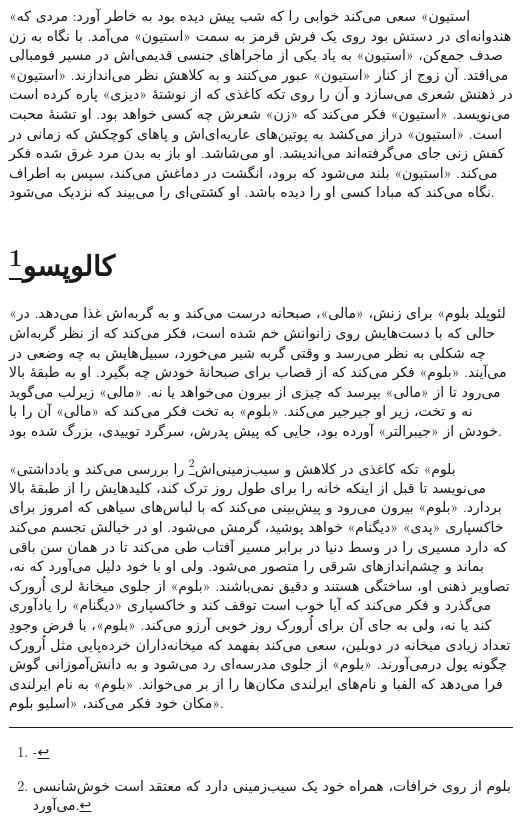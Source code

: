 \documentclass[12pt]{book}
\newcommand{\noun}[1]{«{#1}»}
\begin{document}
    \noun{استیون} سعی می‌کند خوابی را که شب پیش دیده بود به خاطر آورد: مردی که هندوانه‌ای در دستش بود روی یک فرش قرمز به سمت \noun{استیون} می‌آمد. با نگاه به زن صدف جمع‌کن، \noun{استیون} به یاد یکی از ماجراهای جنسی قدیمی‌اش در مسیر فومبالی می‌افتد. آن زوج از کنار \noun{استیون} عبور می‌کنند و به کلاهش نظر می‌اندازند. \noun{استیون} در ذهنش شعری می‌سازد و آن را روی تکه‌ کاغذی که از نوشتۀ \noun{دیزی} پاره کرده است می‌نویسد. \noun{استیون} فکر می‌کند که «زن» شعرش چه کسی خواهد بود. او تشنۀ محبت است. \noun{استیون} دراز می‌کشد به پوتین‌های عاریه‌ای‌اش و پاهای کوچکش که زمانی در کفش زنی جای می‌گرفته‌اند می‌اندیشد. او می‌شاشد. او باز به بدن مرد غرق شده فکر می‌کند. \noun{استیون} بلند می‌شود که برود، انگشت در دماغش می‌کند، سپس به اطراف نگاه می‌کند که مبادا کسی او را دیده باشد. او کشتی‌ای را می‌بیند که نزدیک می‌شود.

    \chapter[کالوپسو]{کالوپسو\protect\footnote{-}}\label{ep:4}
    \noun{لئوپلد بلوم} برای زنش، \noun{مالی}، صبحانه درست می‌کند و به گربه‌اش غذا می‌دهد. در حالی که با دست‌هایش روی زانوانش خم شده است، فکر می‌کند که از نظر گربه‌اش چه شکلی به نظر می‌رسد و وقتی گربه شیر می‌خورد، سبیل‌هایش به چه وضعی در می‌آیند. \noun{بلوم} فکر می‌کند که از قصاب برای صبحانۀ خودش چه بگیرد. او به طبقۀ بالا می‌رود تا از \noun{مالی} بپرسد که چیزی از بیرون می‌خواهد یا نه. \noun{مالی} زیرلب می‌گوید نه و تخت، زیر او جیرجیر می‌کند. \noun{بلوم} به تخت فکر می‌کند که \noun{مالی} آن را با خودش از \noun{جیبرالتر} آورده بود، جایی که پیش پدرش، سرگرد توییدی، بزرگ شده بود.

    \noun{بلوم} تکه کاغذی در کلاهش و سیب‌زمینی‌اش\footnote{بلوم از روی خرافات، همراه خود یک سیب‌زمینی دارد که معتقد است خوش‌شانسی می‌آورد.} را بررسی می‌کند و یادداشتی می‌نویسد تا قبل از اینکه خانه را برای طول روز ترک کند، کلیدهایش را از طبقۀ بالا بردارد. \noun{بلوم} بیرون می‌رود و پیش‌بینی می‌کند که با لباس‌های سیاهی که امروز برای خاکسپاری \noun{پدی} \noun{دیگنام} خواهد پوشید، گرمش می‌شود. او در خیالش تجسم می‌کند که دارد مسیری را در وسط دنیا در برابر مسیر آفتاب طی می‌کند تا در همان سن باقی بماند و چشم‌اندازهای شرقی را متصور می‌شود. ولی او با خود دلیل می‌آورد که نه، تصاویر ذهنی او، ساختگی هستند و دقیق نمی‌باشند. \noun{بلوم} از جلوی میخانۀ لری اُرورک می‌گذرد و فکر می‌کند که آیا خوب است توقف کند و خاکسپاری \noun{دیگنام} را یادآوری کند یا نه، ولی به جای آن برای اُرورک روز خوبی آرزو می‌کند. \noun{بلوم}، با فرض وجودِ تعداد زیادی میخانه در دوبلین، سعی می‌کند بفهمد که میخانه‌داران خرده‌پایی مثل اُرورک چگونه پول درمی‌آورند. \noun{بلوم} از جلوی مدرسه‌ای رد می‌شود و به دانش‌آموزانی گوش فرا می‌دهد که الفبا و نام‌های ایرلندی مکان‌ها را از بر می‌خواند. \noun{بلوم} به نام ایرلندی مکان خود فکر می‌کند، «اسلیو بلوم».
\end{document}
